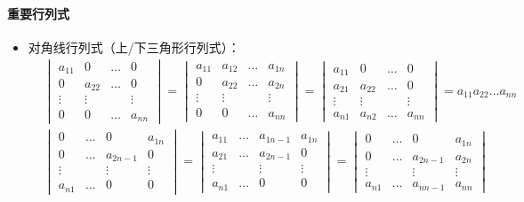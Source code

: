 \documentclass[
12pt, %
a4paper, 
oneside, %
]{scrartcl}
\begin{document}
\paragraph{重要行列式}
\begin{itemize}
\item 对角线行列式（上/下三角形行列式）：
{\footnotesize
\begin{align*}
&\begin{vmatrix} a_{1 1} & 0 & \dots & 0 \\ 0 & a_{2 2} & \dots & 0 \\ \vdots & \vdots & & \vdots \\ 0 & 0 & \dots & a_{n n} \end{vmatrix} 
= \begin{vmatrix} a_{1 1} & a_{1 2} & \dots & a_{1 n} \\ 0 & a_{2 2} & \dots & a_{2 n} \\ \vdots & \vdots & & \vdots \\ 0 & 0 & \dots & a_{n n} \end{vmatrix} 
= \begin{vmatrix} a_{1 1} & 0 & \dots & 0 \\ a_{2 1} & a_{2 2} & \dots & 0 \\ \vdots & \vdots & & \vdots \\ a_{n 1} & a_{n 2} & \dots & a_{n n} \end{vmatrix}
= a_{1 1} a_{2 2} \dots a_{n n} \\  
&\begin{vmatrix} 0 & \dots & 0 & a_{1 n} \\ 0 & \dots & a_{2 n - 1} & 0 \\ \vdots & & \vdots & \vdots \\ a_{n 1} & \dots & 0 & 0 \end{vmatrix} 
= \begin{vmatrix} a_{1 1} & \dots & a_{1 n - 1} & a_{1 n} \\ a_{2 1} & \dots & a_{2 n - 1} & 0 \\ \vdots & & \vdots & \vdots \\ a_{n 1} & \dots & 0 & 0 \end{vmatrix} 
= \begin{vmatrix} 0 & \dots & 0 & a_{1 n} \\ 0 & \dots & a_{2 n - 1} & a_{2 n} \\ \vdots & & \vdots & \vdots \\ a_{n 1} & \dots & a_{n n - 1} & a_{n n} \end{vmatrix}

\end{align*}}
\end{itemize}
\end{document}

